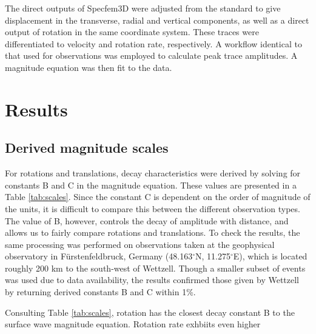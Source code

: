 \documentclass{gji}
\begin{document}
The direct outputs of Specfem3D were adjusted from the standard to give displacement in the transverse, radial and vertical components, as well as a direct output of rotation in the same coordinate system. These traces were differentiated to velocity and rotation rate, respectively.  A workflow identical to that used for observations was employed to calculate peak trace amplitudes. A magnitude equation was then fit to the data.

\section{Results}
\subsection{Derived magnitude scales}
For rotations and translations, decay characteristics were derived by solving for constants B and C in the magnitude equation. These values are presented in a Table \ref{tab:scales}. Since the constant C is dependent on the order of magnitude of the units, it is difficult to compare this between the different observation types. The value of B, however, controls the decay of amplitude with distance, and allows us to fairly compare rotations and translations. To check the results, the same processing was performed on observations taken at the geophysical observatory in F\"urstenfeldbruck, Germany (48.163$^\circ$N, 11.275$^\circ$E), which is located roughly 200 km to the south-west of Wettzell. Though a smaller subset of events was used due to data availability, the results confirmed those given by Wettzell by returning derived constants B and C within 1\%.

Consulting Table \ref{tab:scales}, rotation has the closest decay constant B to the surface wave magnitude equation. Rotation rate exhbiits even higher 
\end{document}
